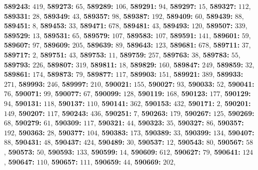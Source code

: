 \textsf{\bfseries 589243:} $419$, \textsf{\bfseries 589273:} $65$, \textsf{\bfseries 589289:} $106$, \textsf{\bfseries 589291:} $94$, \textsf{\bfseries 589297:} $15$, \textsf{\bfseries 589327:} $112$, \textsf{\bfseries 589331:} $28$, \textsf{\bfseries 589349:} $43$, \textsf{\bfseries 589357:} $98$, \textsf{\bfseries 589387:} $192$, \textsf{\bfseries 589409:} $60$, \textsf{\bfseries 589439:} $88$, \textsf{\bfseries 589451:} $8$, \textsf{\bfseries 589453:} $33$, \textsf{\bfseries 589471:} $678$, \textsf{\bfseries 589481:} $43$, \textsf{\bfseries 589493:} $120$, \textsf{\bfseries 589507:} $339$, \textsf{\bfseries 589529:} $13$, \textsf{\bfseries 589531:} $65$, \textsf{\bfseries 589579:} $107$, \textsf{\bfseries 589583:} $107$, \textsf{\bfseries 589591:} $141$, \textsf{\bfseries 589601:} $59$, \textsf{\bfseries 589607:} $97$, \textsf{\bfseries 589609:} $205$, \textsf{\bfseries 589639:} $89$, \textsf{\bfseries 589643:} $123$, \textsf{\bfseries 589681:} $678$, \textsf{\bfseries 589711:} $37$, \textsf{\bfseries 589717:} $2$, \textsf{\bfseries 589751:} $43$, \textsf{\bfseries 589753:} $11$, \textsf{\bfseries 589759:} $257$, \textsf{\bfseries 589763:} $38$, \textsf{\bfseries 589783:} $55$, \textsf{\bfseries 589793:} $226$, \textsf{\bfseries 589807:} $319$, \textsf{\bfseries 589811:} $18$, \textsf{\bfseries 589829:} $160$, \textsf{\bfseries 589847:} $249$, \textsf{\bfseries 589859:} $32$, \textsf{\bfseries 589861:} $174$, \textsf{\bfseries 589873:} $79$, \textsf{\bfseries 589877:} $117$, \textsf{\bfseries 589903:} $151$, \textsf{\bfseries 589921:} $389$, \textsf{\bfseries 589933:} $271$, \textsf{\bfseries 589993:} $246$, \textsf{\bfseries 589997:} $210$, \textsf{\bfseries 590021:} $155$, \textsf{\bfseries 590027:} $93$, \textsf{\bfseries 590033:} $52$, \textsf{\bfseries 590041:} $76$, \textsf{\bfseries 590071:} $99$, \textsf{\bfseries 590077:} $67$, \textsf{\bfseries 590099:} $128$, \textsf{\bfseries 590119:} $168$, \textsf{\bfseries 590123:} $177$, \textsf{\bfseries 590129:} $94$, \textsf{\bfseries 590131:} $118$, \textsf{\bfseries 590137:} $110$, \textsf{\bfseries 590141:} $362$, \textsf{\bfseries 590153:} $432$, \textsf{\bfseries 590171:} $2$, \textsf{\bfseries 590201:} $149$, \textsf{\bfseries 590207:} $117$, \textsf{\bfseries 590243:} $436$, \textsf{\bfseries 590251:} $7$, \textsf{\bfseries 590263:} $179$, \textsf{\bfseries 590267:} $125$, \textsf{\bfseries 590269:} $68$, \textsf{\bfseries 590279:} $61$, \textsf{\bfseries 590309:} $117$, \textsf{\bfseries 590321:} $44$, \textsf{\bfseries 590323:} $35$, \textsf{\bfseries 590327:} $86$, \textsf{\bfseries 590357:} $192$, \textsf{\bfseries 590363:} $28$, \textsf{\bfseries 590377:} $104$, \textsf{\bfseries 590383:} $173$, \textsf{\bfseries 590389:} $33$, \textsf{\bfseries 590399:} $134$, \textsf{\bfseries 590407:} $88$, \textsf{\bfseries 590431:} $48$, \textsf{\bfseries 590437:} $424$, \textsf{\bfseries 590489:} $30$, \textsf{\bfseries 590537:} $12$, \textsf{\bfseries 590543:} $80$, \textsf{\bfseries 590567:} $58$, \textsf{\bfseries 590573:} $50$, \textsf{\bfseries 590593:} $133$, \textsf{\bfseries 590599:} $14$, \textsf{\bfseries 590609:} $612$, \textsf{\bfseries 590627:} $79$, \textsf{\bfseries 590641:} $124$, \textsf{\bfseries 590647:} $110$, \textsf{\bfseries 590657:} $111$, \textsf{\bfseries 590659:} $44$, \textsf{\bfseries 590669:} $202$, 
